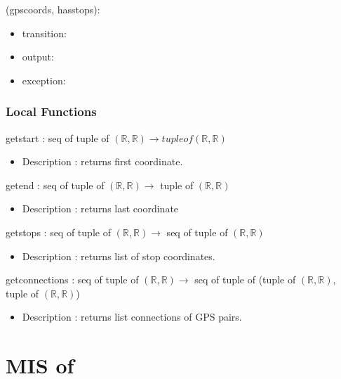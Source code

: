 \documentclass[12pt, titlepage]{article}
\begin{document}
\noindent {}(gpscoords, hasstops):
\begin{itemize}
\item transition:  
\item output:  
\item exception:  
\end{itemize}

\subsubsection{Local Functions}

getstart : seq of tuple of $(\mathbb{R}, \mathbb{R})  \rightarrow tuple of (\mathbb{R}, \mathbb{R})$
\begin{itemize}
    \item Description : returns first coordinate.
\end{itemize}
getend : seq of tuple of $(\mathbb{R}, \mathbb{R})  \rightarrow$ tuple of $(\mathbb{R}, \mathbb{R})$
\begin{itemize}
    \item Description : returns last coordinate
\end{itemize}
getstops : seq of tuple of $(\mathbb{R}, \mathbb{R})  \rightarrow$ seq of tuple of $(\mathbb{R}, \mathbb{R})$
\begin{itemize}
    \item Description : returns list of stop coordinates.
\end{itemize}
getconnections : seq of tuple of $(\mathbb{R}, \mathbb{R})  \rightarrow$ seq of tuple of (tuple of $(\mathbb{R}, \mathbb{R}),$ tuple of $(\mathbb{R}, \mathbb{R})$)
\begin{itemize}
    \item Description : returns list connections of GPS pairs.
\end{itemize}
\newpage

\color{red}
\section{MIS of } \label{Module} 
\end{document}
